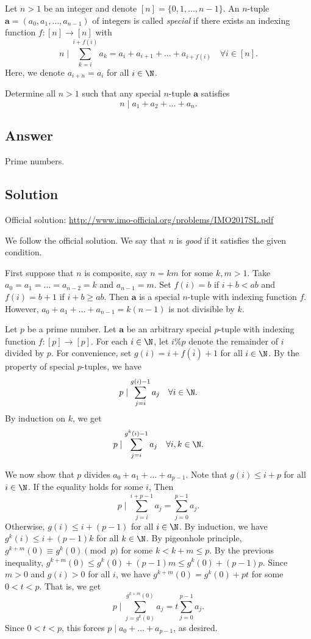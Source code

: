 Let $n > 1$ be an integer and denote $[n] = \{0, 1, \ldots, n - 1\}$.
An $n$-tuple $\mathbf{a} = (a_0, a_1, \ldots, a_{n - 1})$ of integers is called \emph{special} if there exists an indexing function $f : [n] \to [n]$ with
\[ n \mid \sum_{k = i}^{i + f(i)} a_k = a_i + a_{i + 1} + \ldots + a_{i + f(i)} \quad \forall i \in [n]. \]
Here, we denote $a_{i + n} = a_i$ for all $i \in \N$.

Determine all $n > 1$ such that any special $n$-tuple $\mathbf{a}$ satisfies
\[ n \mid a_1 + a_2 + \ldots + a_n. \]



\subsection*{Answer}

Prime numbers.



\subsection*{Solution}

Official solution: \url{http://www.imo-official.org/problems/IMO2017SL.pdf}

We follow the official solution.
We say that $n$ is \emph{good} if it satisfies the given condition.

First suppose that $n$ is composite, say $n = km$ for some $k, m > 1$.
Take $a_0 = a_1 = \ldots = a_{n - 2} = k$ and $a_{n - 1} = m$.
Set $f(i) = b$ if $i + b < ab$ and $f(i) = b + 1$ if $i + b \geq ab$.
Then $\mathbf{a}$ is a special $n$-tuple with indexing function $f$.
However, $a_0 + a_1 + \ldots + a_{n - 1} = k(n - 1)$ is not divisible by $k$.

Let $p$ be a prime number.
Let $\mathbf{a}$ be an arbitrary special $p$-tuple with indexing function $f : [p] \to [p]$.
For each $i \in \N$, let $i \% p$ denote the remainder of $i$ divided by $p$.
For convenience, set $g(i) = i + f(\overline{i}) + 1$ for all $i \in \N$.
By the property of special $p$-tuples, we have
\[ p \mid \sum_{j = i}^{g(i) - 1} a_j \quad \forall i \in \N. \]
By induction on $k$, we get
\[ p \mid \sum_{j = i}^{g^k(i) - 1} a_j \quad \forall i, k \in \N. \]

We now show that $p$ divides $a_0 + a_1 + \ldots + a_{p - 1}$.
Note that $g(i) \leq i + p$ for all $i \in \N$.
If the equality holds for some $i$, Then
\[ p \mid \sum_{j = i}^{i + p - 1} a_j = \sum_{j = 0}^{p - 1} a_j. \]
Otherwise, $g(i) \leq i + (p - 1)$ for all $i \in \N$.
By induction, we have $g^k(i) \leq i + (p - 1)k$ for all $k \in \N$.
By pigeonhole principle, $g^{k + m}(0) \equiv g^k(0) \pmod{p}$ for some $k < k + m \leq p$.
By the previous inequality, $g^{k + m}(0) \leq g^k(0) + (p - 1)m \leq g^k(0) + (p - 1)p$.
Since $m > 0$ and $g(i) > 0$ for all $i$, we have $g^{k + m}(0) = g^k(0) + pt$ for some $0 < t < p$.
That is, we get
\[ p \mid \sum_{j = g^k(0)}^{g^{k + m}(0)} a_j = t \sum_{j = 0}^{p - 1} a_j. \]
Since $0 < t < p$, this forces $p \mid a_0 + \ldots + a_{p - 1}$, as desired.
